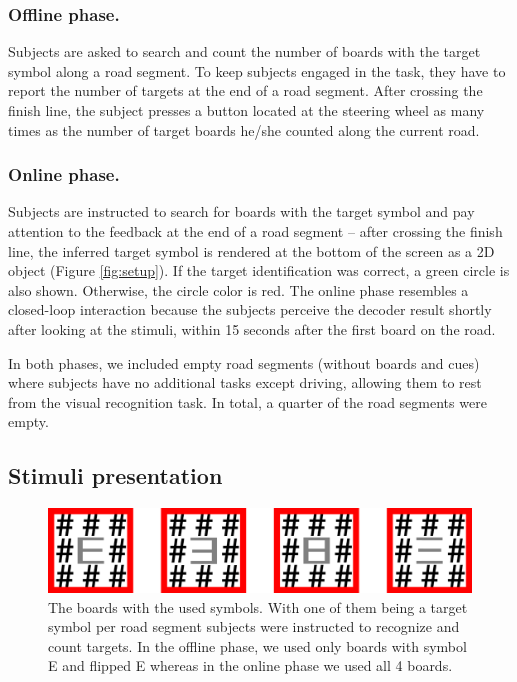 \documentclass[12pt]{iopart}
\begin{document}

\subsubsection*{Offline phase.}
Subjects are asked  to search and count the number of boards with the target symbol along a road segment. To keep subjects engaged in the task, they have to report the number of targets at the end of a road segment. After crossing the finish line, the subject presses 
a button located at the steering wheel as many times
as the number of target boards he/she counted along the current road.

\subsubsection*{Online phase.}
Subjects are instructed to search for boards with the target symbol and pay attention to the feedback at the end of a road segment -- after crossing the finish line, the inferred target symbol is rendered at the bottom of the screen as a 2D object (Figure \ref{fig:setup}). 
If the target identification was correct, a green circle is also shown. Otherwise, the circle color is red.
The online phase resembles a closed-loop interaction because
the subjects perceive the decoder result shortly after
looking at the stimuli, within 15 seconds after the first board on the road.

In both phases, we included empty road segments (without boards and cues) where subjects have no additional tasks 
except driving, allowing them to rest from the visual recognition task.
In total, a quarter of the road segments were empty.

\subsection{Stimuli presentation}
\label{sec:stim}

\begin{figure}[!t]
\center
    \includegraphics[trim={0cm 0cm 0cm 0cm},clip,width=0.80\columnwidth]{../images/Stimuli.png}
    \caption{The boards with the used symbols. With one of them being a target symbol per road segment
        subjects were instructed to recognize and count targets. In the offline phase, we used only boards 
        with symbol E and flipped E whereas in the online phase we used all 4 boards.}
\label{fig:boards}
\end{figure}
\end{document}
